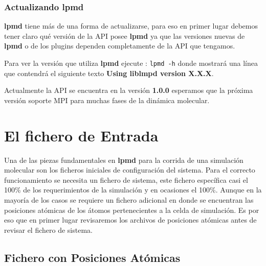 \documentclass[a4paper,10pt]{scrbook}
\newcommand{\lpmd}{\textbf{lpmd }}
\begin{document}
\subsection{Actualizando lpmd}

\lpmd tiene m\'as de una forma de actualizarse, para eso en primer lugar debemos tener claro qu\'e versi\'on de la API posee \lpmd ya que las versiones nuevas de \lpmd o de los plugins dependen completamente de la API que tengamos.

Para ver la versi\'on que utiliza \lpmd ejecute : \verb|lpmd -h| donde mostrar\'a una l\'inea que contendr\'a el siguiente texto \textbf{Using liblmpd version X.X.X}.

Actualmente la API se encuentra en la versi\'on \textbf{1.0.0} esperamos que la pr\'oxima versi\'on soporte MPI para muchas fases de la din\'amica molecular.


\chapter{El fichero de Entrada}
\label{chap:input}

Una de las piezas fundamentales en \lpmd para la corrida de una simulaci\'on molecular son los ficheros iniciales de configuraci\'on del sistema. Para el correcto funcionamiento se necesita un fichero de sistema, este fichero espec\'ifica casi el 100\% de los requerimientos de la simulaci\'on y en ocasiones el 100\%. Aunque en la mayor\'ia de los casos se requiere un fichero adicional en donde se encuentran las posiciones at\'omicas de los \'atomos pertenecientes a la celda de simulaci\'on. Es por eso que en primer lugar revisaremos los archivos de posiciones at\'omicas antes de revisar el fichero de sistema.

\section{Fichero con Posiciones At\'omicas}
\end{document}
